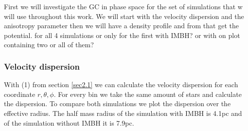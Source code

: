 First we will investigate the \ac{GC} in phase space for the set of simulations that w will use throughout this work. We will start with the velocity dispersion and the anisotropy parameter then we will have a density profile and from that get the potential. \color{red} for all 4 simulations or only for the first with IMBH? or with on plot containing two or all of them? \color{black}

\subsubsection{Velocity dispersion}
With (1) from section \ref{sec2.1} we can calculate the velocity dispersion for each coordinate \(r,\theta,\phi\). For every bin we take the same amount of stars and calculate the dispersion. To compare both simulations we plot the dispersion over the effective radius. The half mass radius of the simulation with \ac{IMBH} is 4.1pc and of the simulation without \ac{IMBH} it is 7.9pc. 
